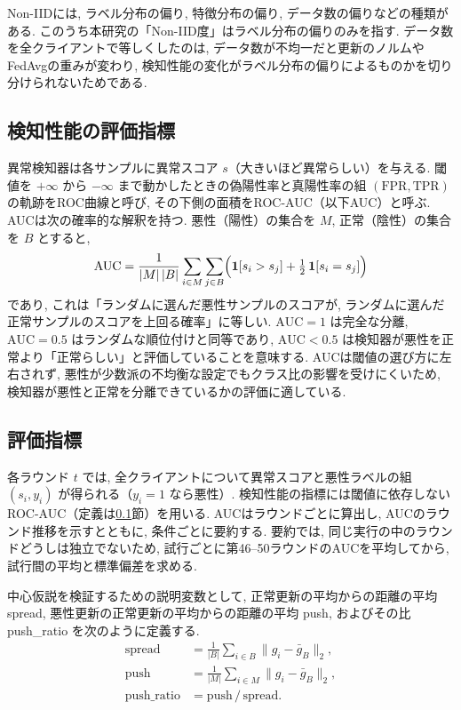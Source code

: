 \documentclass[a4j, dvipdfmx]{jsarticle}
\newcommand{\PushRatio}{\textrm{push\_ratio}}
\newcommand{\Spread}{\textrm{spread}}
\newcommand{\Push}{\textrm{push}}
\begin{document}
Non-IIDには, ラベル分布の偏り, 特徴分布の偏り, データ数の偏りなどの種類がある\cite{li2022federated}. このうち本研究の「Non-IID度」はラベル分布の偏りのみを指す. データ数を全クライアントで等しくしたのは, データ数が不均一だと更新のノルムやFedAvgの重みが変わり, 検知性能の変化がラベル分布の偏りによるものかを切り分けられないためである.

\subsection{検知性能の評価指標}
\label{sec:roc-auc}

異常検知器は各サンプルに異常スコア $s$（大きいほど異常らしい）を与える. 閾値を $+\infty$ から $-\infty$ まで動かしたときの偽陽性率と真陽性率の組 $(\mathrm{FPR}, \mathrm{TPR})$ の軌跡をROC曲線と呼び, その下側の面積をROC-AUC（以下AUC）と呼ぶ\cite{fawcett2006roc}. AUCは次の確率的な解釈を持つ\cite{hanley1982meaning}. 悪性（陽性）の集合を $M$, 正常（陰性）の集合を $B$ とすると,
\begin{equation}
\mathrm{AUC}
= \frac{1}{|M|\,|B|}\sum_{i \in M}\sum_{j \in B}
\Bigl( \mathbf{1}[s_i > s_j] + \tfrac{1}{2}\,\mathbf{1}[s_i = s_j] \Bigr)
\label{eq:auc}
\end{equation}
であり, これは「ランダムに選んだ悪性サンプルのスコアが, ランダムに選んだ正常サンプルのスコアを上回る確率」に等しい. $\mathrm{AUC}=1$ は完全な分離, $\mathrm{AUC}=0.5$ はランダムな順位付けと同等であり, $\mathrm{AUC}<0.5$ は検知器が悪性を正常より「正常らしい」と評価していることを意味する. AUCは閾値の選び方に左右されず, 悪性が少数派の不均衡な設定でもクラス比の影響を受けにくいため, 検知器が悪性と正常を分離できているかの評価に適している.

\subsection{評価指標}
\label{sec:metrics}

各ラウンド $t$ では, 全クライアントについて異常スコアと悪性ラベルの組 $(s_i, y_i)$ が得られる（$y_i = 1$ なら悪性）. 検知性能の指標には閾値に依存しないROC-AUC（定義は\ref{sec:roc-auc}節）を用いる. AUCはラウンドごとに算出し, AUCのラウンド推移を示すとともに, 条件ごとに要約する. 要約では, 同じ実行の中のラウンドどうしは独立でないため, 試行ごとに第46--50ラウンドのAUCを平均してから, 試行間の平均と標準偏差を求める.

中心仮説を検証するための説明変数として, 正常更新の平均からの距離の平均 \Spread{}, 悪性更新の正常更新の平均からの距離の平均 \Push{}, およびその比 \PushRatio{} を次のように定義する.
\begin{align*}
  \Spread &= \tfrac{1}{|B|}\textstyle\sum_{i \in B}\|g_i - \bar{g}_B\|_2, \\
  \Push   &= \tfrac{1}{|M|}\textstyle\sum_{i \in M}\|g_i - \bar{g}_B\|_2, \\
  \PushRatio &= \Push\,/\,\Spread.
\end{align*}
\end{document}
